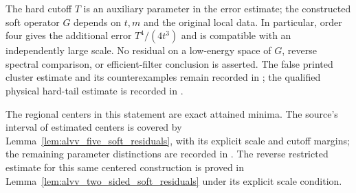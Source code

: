 The hard cutoff $T$ is an auxiliary parameter in the error estimate;
the constructed soft operator $G$ depends on $t,m$ and the original
local data. In particular, order four gives the additional error
$T^4/(4t^3)$ and is compatible with an independently large scale.
No residual on a low-energy space of $G$, reverse spectral comparison,
or efficient-filter conclusion is asserted. The false printed cluster
estimate and its counterexamples remain recorded in
\cite{gap:alvv16_cluster_approximation}; the qualified physical hard-tail
estimate is recorded in \cite{gap:alvv16_hard_truncation_windows}.


The regional centers in this statement are exact attained minima. The
source's interval of estimated centers is covered by
Lemma~\ref{lem:alvv_five_soft_residuals}, with its explicit scale and
cutoff margins; the remaining parameter distinctions are recorded in \cite{gap:alvv16_soft_regional_residuals}. The reverse
restricted estimate for this same centered construction is proved in
Lemma~\ref{lem:alvv_two_sided_soft_residuals} under its explicit scale
condition.
